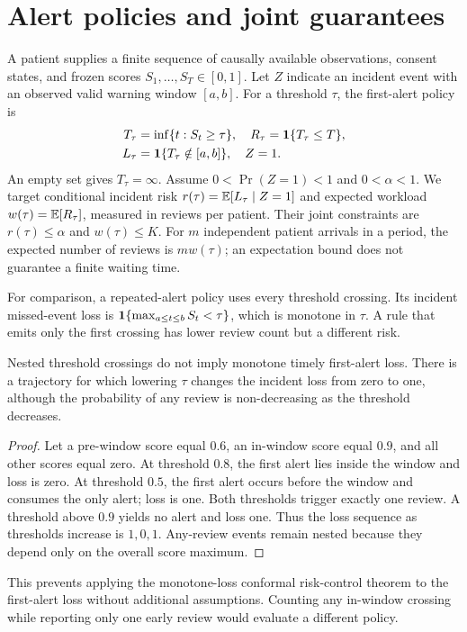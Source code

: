 \section*{Alert policies and joint guarantees}
A patient supplies a finite sequence of causally available observations, consent states, and frozen scores $S_1,\ldots,S_T\in[0,1]$. Let $Z$ indicate an incident event with an observed valid warning window $[a,b]$. For a threshold $\tau$, the first-alert policy is
\begin{equation*}
 \begin{aligned}
 T_\tau&=\inf\{t:S_t\ge\tau\},\quad R_\tau=\mathbf 1\{T_\tau\le T\},\\
 L_\tau&=\mathbf 1\{T_\tau\notin[a,b]\},\quad Z=1.
 \end{aligned}
\end{equation*}
An empty set gives $T_\tau=\infty$. Assume $0<\Pr(Z=1)<1$ and $0<\alpha<1$. We target conditional incident risk $r(\tau)=\mathbb E[L_\tau\mid Z=1]$ and expected workload $w(\tau)=\mathbb E[R_\tau]$, measured in reviews per patient. Their joint constraints are $r(\tau)\le\alpha$ and $w(\tau)\le K$. For $m$ independent patient arrivals in a period, the expected number of reviews is $mw(\tau)$; an expectation bound does not guarantee a finite waiting time.

For comparison, a repeated-alert policy uses every threshold crossing. Its incident missed-event loss is $\mathbf 1\{\max_{a\le t\le b}S_t<\tau\}$, which is monotone in $\tau$. A rule that emits only the first crossing has lower review count but a different risk.

\begin{proposition}
Nested threshold crossings do not imply monotone timely first-alert loss. There is a trajectory for which lowering $\tau$ changes the incident loss from zero to one, although the probability of any review is non-decreasing as the threshold decreases.
\end{proposition}
\begin{proof}
Let a pre-window score equal $0.6$, an in-window score equal $0.9$, and all other scores equal zero. At threshold $0.8$, the first alert lies inside the window and loss is zero. At threshold $0.5$, the first alert occurs before the window and consumes the only alert; loss is one. Both thresholds trigger exactly one review. A threshold above $0.9$ yields no alert and loss one. Thus the loss sequence as thresholds increase is $1,0,1$. Any-review events remain nested because they depend only on the overall score maximum.
\end{proof}
This prevents applying the monotone-loss conformal risk-control theorem \citep{crc} to the first-alert loss without additional assumptions. Counting any in-window crossing while reporting only one early review would evaluate a different policy.

